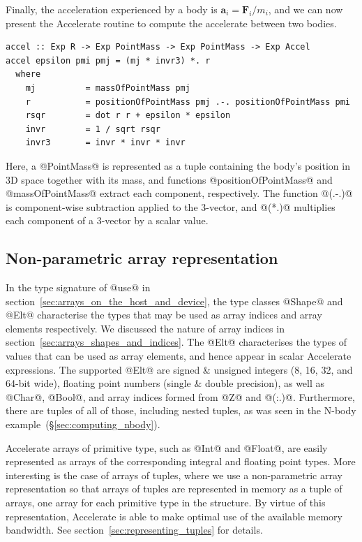 Finally, the acceleration experienced by a body is $\mathbf{a}_i =
\mathbf{F}_i/m_i$, and we can now present the Accelerate routine to compute the
accelerate between two bodies.
%
%
%
\begin{lstlisting}[style=haskell]
accel :: Exp R -> Exp PointMass -> Exp PointMass -> Exp Accel
accel epsilon pmi pmj = (mj * invr3) *. r
  where
    mj          = massOfPointMass pmj
    r           = positionOfPointMass pmj .-. positionOfPointMass pmi
    rsqr        = dot r r + epsilon * epsilon
    invr        = 1 / sqrt rsqr
    invr3       = invr * invr * invr
\end{lstlisting}
%
Here, a @PointMass@ is represented as a tuple containing the body's position in
3D space together with its mass, and functions @positionOfPointMass@ and
@massOfPointMass@ extract each component, respectively. The function @(.-.)@ is
component-wise subtraction applied to the 3-vector, and @(*.)@ multiplies each
component of a 3-vector by a scalar value.


\subsection{Non-parametric array representation}

In the type signature of @use@ in
section~\ref{sec:arrays_on_the_host_and_device}, the type classes @Shape@ and
@Elt@ characterise the types that may be used as array indices and array
elements respectively. We discussed the nature of array indices in
section~\ref{sec:arrays_shapes_and_indices}. The @Elt@ characterises the types
of values that can be used as array elements, and hence appear in scalar
Accelerate expressions. The supported @Elt@ are signed \& unsigned integers (8,
16, 32, and 64-bit wide), floating point numbers (single \& double precision),
as well as @Char@, @Bool@, and array indices formed from @Z@ and @(:.)@.
Furthermore, there are tuples of all of those, including nested tuples, as was
seen in the N-body example~(\S\ref{sec:computing_nbody}).

Accelerate arrays of primitive type, such as @Int@ and @Float@, are easily
represented as arrays of the corresponding integral and floating point types.
More interesting is the case of arrays of tuples, where we use a non-parametric
array representation so that arrays of tuples are represented in memory as a
tuple of arrays, one array for each primitive type in the structure. By virtue
of this representation, Accelerate is able to make optimal use of the available
memory bandwidth. See section~\ref{sec:representing_tuples} for details.

